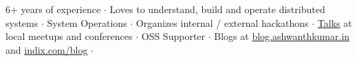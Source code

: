 

\begin{cvparagraph}
6+ years of experience ${\cdotp}$ Loves to understand, build and operate distributed systems ${\cdotp}$ System Operations ${\cdotp}$ Organizes internal / external hackathons ${\cdotp}$ \href{https://github.com/ashwanthkumar/talks}{Talks} at local meetups and conferences ${\cdotp}$ OSS Supporter ${\cdotp}$ Blogs at \href{http://blog.ashwanthkumar.in/}{blog.ashwanthkumar.in} and \href{http://www.indix.com/blog/author/ashwanth/}{indix.com/blog} ${\cdotp}$
\end{cvparagraph}
